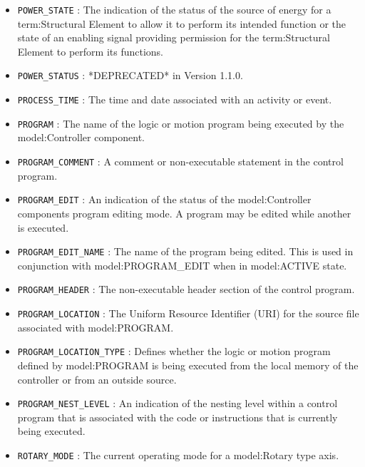 \begin{itemize}
\item \texttt{POWER_STATE} : The indication of the status of the source of energy for a {term:Structural Element} to allow it to perform its intended function or the state of an enabling signal providing permission for the {term:Structural Element} to perform its functions. 

\item \texttt{POWER_STATUS} : *DEPRECATED* in Version 1.1.0. 

\item \texttt{PROCESS_TIME} : The time and date associated with an activity or event. 

\item \texttt{PROGRAM} : The name of the logic or motion program being executed by the {model:Controller} component. 

\item \texttt{PROGRAM_COMMENT} : A comment or non-executable statement in the control program. 

\item \texttt{PROGRAM_EDIT} : An indication of the status of the {model:Controller} components program editing mode. A program may be edited while another is executed. 

\item \texttt{PROGRAM_EDIT_NAME} : The name of the program being edited. 
 This is used in conjunction with {model:PROGRAM_EDIT} when in {model:ACTIVE} state.  

\item \texttt{PROGRAM_HEADER} : The non-executable header section of the control program. 

\item \texttt{PROGRAM_LOCATION} : The Uniform Resource Identifier (URI) for the source file associated with {model:PROGRAM}. 

\item \texttt{PROGRAM_LOCATION_TYPE} : Defines whether the logic or motion program defined by {model:PROGRAM} is being executed from the local memory of the controller or from an outside source. 

\item \texttt{PROGRAM_NEST_LEVEL} : An indication of the nesting level within a control program that is associated with the code or instructions that is currently being executed. 

\item \texttt{ROTARY_MODE} : The current operating mode for a {model:Rotary} type axis. 


\end{itemize}
